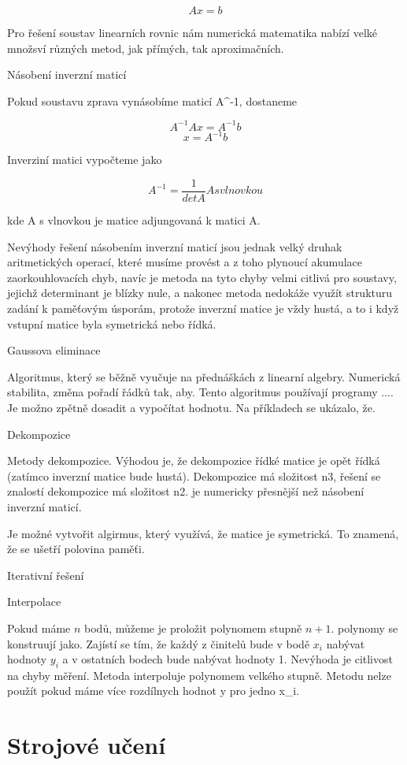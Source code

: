 \documentclass[
  color, %
  table, %
  lof,   %
  lot,   %
]{fithesis3}
\begin{document}
\[Ax = b\]

Pro řešení soustav linearních rovnic nám numerická matematika nabízí velké množsví různých metod, jak přímých, tak aproximačních.

Násobení inverzní maticí

Pokud soustavu zprava vynásobíme maticí A^-1, dostaneme

\[A^{-1}Ax = A^{-1}b\]
\[x = A^{-1}b\]

Inverziní matici vypočteme jako

\[A^{-1} = \frac{1}{det A} A s vlnovkou\]

kde A s vlnovkou je matice adjungovaná k matici A.

Nevýhody řešení násobením inverzní maticí jsou jednak velký druhak aritmetických operací, které musíme provést a z toho plynoucí akumulace zaorkouhlovacích chyb, navíc je metoda na tyto chyby velmi citlivá pro soustavy, jejichž determinant je blízky nule, a nakonec metoda nedokáže využít strukturu zadání k paměťovým úsporám, protože inverzní matice je vždy hustá, a to i když vstupní matice byla symetrická nebo řídká.

Gaussova eliminace

Algoritmus, který se běžně vyučuje na přednáškách z linearní algebry. Numerická stabilita, změna pořadí řádků tak, aby. Tento algoritmus používají programy .... Je možno zpětně dosadit a vypočítat hodnotu. Na příkladech se ukázalo, že.

Dekompozice

Metody dekompozice. Výhodou je, že dekompozice řídké matice je opět řídká (zatímco inverzní matice bude hustá). Dekompozice má složitost n3, řešení se znalostí dekompozice má složitost n2. je numericky přesnější než násobení inverzní maticí.

Je možné vytvořit algirmus, který využívá, že matice je symetrická. To znamená, že se ušetří polovina paměťi.

Iterativní řešení

Interpolace

Pokud máme $n$ bodů, můžeme je proložit polynomem stupně $n+1$. polynomy se konstruují jako. Zajístí se tím, že každý z činitelů bude v bodě $x_i$ nabývat hodnoty $y_i$ a v ostatních bodech bude nabývat hodnoty 1. Nevýhoda je citlivost na chyby měření. Metoda interpoluje polynomem velkého stupně. Metodu nelze použít pokud máme více rozdílnych hodnot y pro jedno x_i.

\chapter{Strojové učení}
\end{document}
